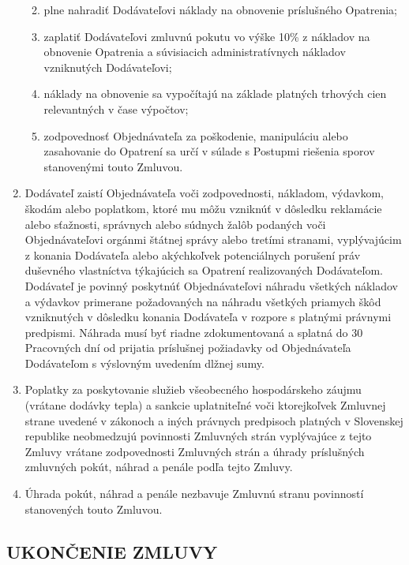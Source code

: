 \begin{multicols}{2}
\begin{enumerate}
  \begin{enumerate}
  \def\labelenumii{\arabic{enumii}.}
  \item
    plne nahradiť Dodávateľovi náklady na obnovenie príslušného
    Opatrenia;
  \item
    zaplatiť Dodávateľovi zmluvnú pokutu vo výške 10\% z nákladov na
    obnovenie Opatrenia a súvisiacich administratívnych nákladov
    vzniknutých Dodávateľovi;
  \item
    náklady na obnovenie sa vypočítajú na základe platných trhových cien
    relevantných v čase výpočtov;
  \item
    zodpovednosť Objednávateľa za poškodenie, manipuláciu alebo
    zasahovanie do Opatrení sa určí v súlade s Postupmi riešenia sporov
    stanovenými touto Zmluvou.
  \end{enumerate}
\item
  Dodávateľ zaistí Objednávateľa voči zodpovednosti, nákladom, výdavkom,
  škodám alebo poplatkom, ktoré mu môžu vzniknúť v dôsledku reklamácie
  alebo sťažnosti, správnych alebo súdnych žalôb podaných voči
  Objednávateľovi orgánmi štátnej správy alebo tretími stranami,
  vyplývajúcim z konania Dodávateľa alebo akýchkoľvek potenciálnych
  porušení práv duševného vlastníctva týkajúcich sa Opatrení
  realizovaných Dodávateľom. Dodávateľ je povinný poskytnúť
  Objednávateľovi náhradu všetkých nákladov a výdavkov primerane
  požadovaných na náhradu všetkých priamych škôd vzniknutých v dôsledku
  konania Dodávateľa v rozpore s platnými právnymi predpismi. Náhrada
  musí byť riadne zdokumentovaná a splatná do 30 Pracovných dní od
  prijatia príslušnej požiadavky od Objednávateľa Dodávateľom s
  výslovným uvedením dlžnej sumy.
\item
  Poplatky za poskytovanie služieb všeobecného hospodárskeho záujmu
  (vrátane dodávky tepla) a sankcie uplatniteľné voči ktorejkoľvek
  Zmluvnej strane uvedené v zákonoch a iných právnych predpisoch
  platných v Slovenskej republike neobmedzujú povinnosti Zmluvných strán
  vyplývajúce z tejto Zmluvy vrátane zodpovednosti Zmluvných strán a
  úhrady príslušných zmluvných pokút, náhrad a penále podľa tejto
  Zmluvy.
\item
  Úhrada pokút, náhrad a penále nezbavuje Zmluvnú stranu povinností
  stanovených touto Zmluvou.
\end{enumerate}

\subsection{UKONČENIE ZMLUVY}


\end{multicols}

